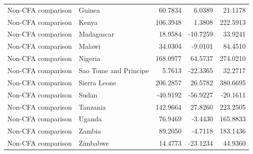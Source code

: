 \begin{table}
\begin{tabular}[t]{llrrr}
Non-CFA comparison & Guinea & 60.7834 & 6.0389 & 21.1178\\
Non-CFA comparison & Kenya & 106.3948 & 1.3808 & 222.5913\\
\addlinespace
Non-CFA comparison & Madagascar & 18.9584 & -10.7259 & 33.9241\\
Non-CFA comparison & Malawi & 34.0304 & -9.0101 & 84.4510\\
Non-CFA comparison & Nigeria & 168.0977 & 64.5737 & 274.0210\\
Non-CFA comparison & Sao Tome and Principe & 5.7613 & -22.3365 & 32.2717\\
Non-CFA comparison & Sierra Leone & 206.2857 & 26.5782 & 380.6695\\
\addlinespace
Non-CFA comparison & Sudan & -40.9192 & -56.9227 & -20.1611\\
Non-CFA comparison & Tanzania & 142.9664 & 27.8260 & 223.2505\\
Non-CFA comparison & Uganda & 76.9469 & -3.4430 & 165.8833\\
Non-CFA comparison & Zambia & 89.2050 & -4.7118 & 183.1436\\
Non-CFA comparison & Zimbabwe & 14.4773 & -23.1234 & 44.9360\\
\bottomrule
\end{tabular}
\end{table}